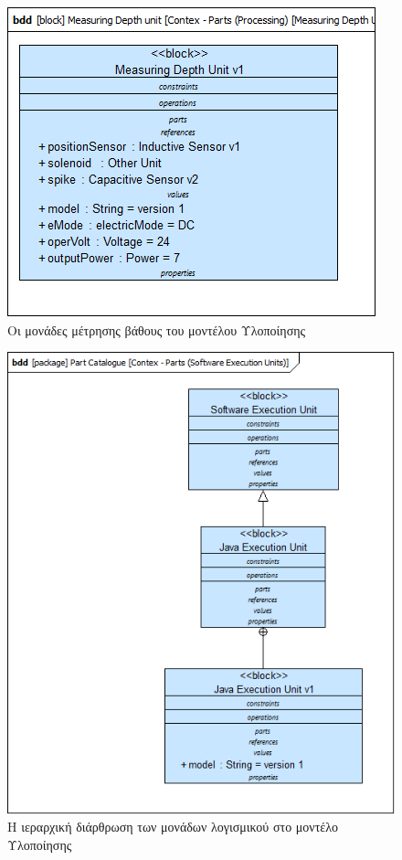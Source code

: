 \documentclass[a4paper,12pt,twoside]{report}
\begin{document}
{\begin{appendices}
				\begin{figure}[hp]
					\centering
					\includegraphics[scale=0.50]{DesignModel_Contex-Parts(ProcessingUnits)[MeasuringDepthUnits].png}
					\caption{Οι μονάδες μέτρησης βάθους του μοντέλου Υλοποίησης}
					\label{φωτ:Οι μονάδες μέτρησης βάθους του μοντέλου Υλοποίησης}
				\end{figure}
				
				
				\begin{figure}[hp]
					\centering
					\includegraphics[scale=0.50]{DesignModel_Contex-Parts(SoftwareExecutionUnits).png}
					\caption{Η ιεραρχική διάρθρωση των μονάδων λογισμικού στο μοντέλο Υλοποίησης}
					\label{φωτ:Η ιεραρχική διάρθρωση των μονάδων λογισμικού στο μοντέλο Υλοποίησης}
				\end{figure}
				

\end{appendices}}
\end{document}
